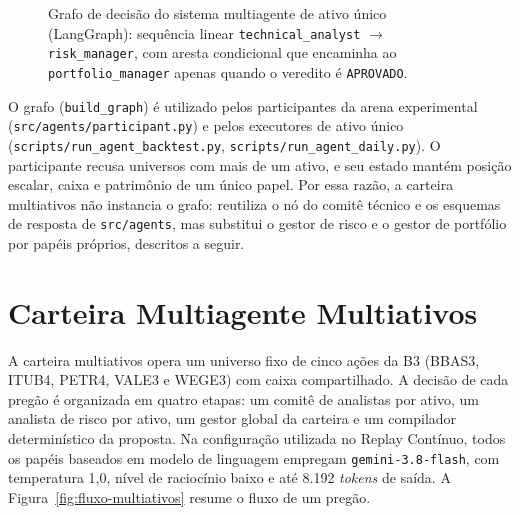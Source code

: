 \begin{figure}[htbp]
\centering
{}
\caption{Grafo de decisão do sistema multiagente de ativo único (LangGraph): sequência linear \texttt{technical\_analyst} $\rightarrow$ \texttt{risk\_manager}, com aresta condicional que encaminha ao \texttt{portfolio\_manager} apenas quando o veredito é \texttt{APROVADO}.}
\label{fig:grafo-langgraph}
\end{figure}

O grafo (\texttt{build\_graph}) é utilizado pelos participantes da arena experimental (\texttt{src/agents/participant.py}) e pelos executores de ativo único (\texttt{scripts/run\_agent\_backtest.py}, \texttt{scripts/run\_agent\_daily.py}). O participante recusa universos com mais de um ativo, e seu estado mantém posição escalar, caixa e patrimônio de um único papel. Por essa razão, a carteira multiativos não instancia o grafo: reutiliza o nó do comitê técnico e os esquemas de resposta de \texttt{src/agents}, mas substitui o gestor de risco e o gestor de portfólio por papéis próprios, descritos a seguir.

\section{Carteira Multiagente Multiativos}
\label{sec:arq-multiativos}

A carteira multiativos opera um universo fixo de cinco ações da B3 (BBAS3, ITUB4, PETR4, VALE3 e WEGE3) com caixa compartilhado. A decisão de cada pregão é organizada em quatro etapas: um comitê de analistas por ativo, um analista de risco por ativo, um gestor global da carteira e um compilador determinístico da proposta. Na configuração utilizada no Replay Contínuo, todos os papéis baseados em modelo de linguagem empregam \texttt{gemini-3.8-flash}, com temperatura 1,0, nível de raciocínio baixo e até 8.192 \textit{tokens} de saída. A Figura~\ref{fig:fluxo-multiativos} resume o fluxo de um pregão.

